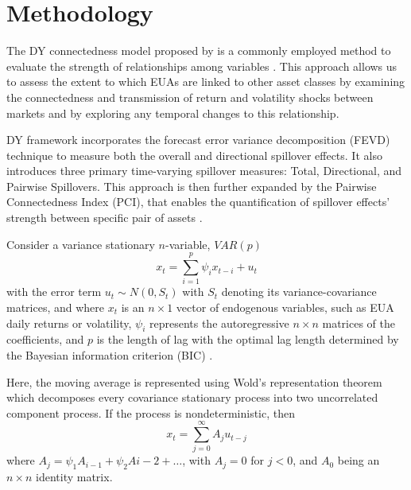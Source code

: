 \documentclass[preprint, 3p,
authoryear]{elsarticle} %
\begin{document}
\hypertarget{methodology}{%
\section{Methodology}\label{methodology}}

The DY connectedness model proposed by
\citet{diebold_measuring_2009, diebold_better_2012, diebold_network_2014}
is a commonly employed method to evaluate the strength of relationships
among variables
\citep{zhang_dynamic_2016, xia_asymmetric_2019, ji_information_2019, tan_how_2020, gabauer_dynamic_2021, hanif_nonlinear_2021, diebold_past_2023, dong_risk_2024, gong_physical_2024}.
This approach allows us to assess the extent to which EUAs are linked to
other asset classes by examining the connectedness and transmission of
return and volatility shocks between markets and by exploring any
temporal changes to this relationship.

DY framework incorporates the forecast error variance decomposition
(FEVD) technique to measure both the overall and directional spillover
effects. It also introduces three primary time-varying spillover
measures: Total, Directional, and Pairwise Spillovers. This approach is
then further expanded by the Pairwise Connectedness Index (PCI), that
enables the quantification of spillover effects' strength between
specific pair of assets \citep{gabauer_dynamic_2021}.

Consider a variance stationary \(n\)-variable, \(VAR(p)\)
\begin{equation}
x_t = \sum_{i=1}^p\psi_ix_{t-i}+u_t
\end{equation} with the error term \(u_t \sim N(0,S_t)\) with \(S_t\)
denoting its variance-covariance matrices, and where \(x_t\) is an
\(n \times 1\) vector of endogenous variables, such as EUA daily returns
or volatility, \(\psi_i\) represents the autoregressive \(n \times n\)
matrices of the coefficients, and \(p\) is the length of lag with the
optimal lag length determined by the Bayesian information criterion
(BIC) \citep{diebold_better_2012, pham_impact_2023}.

Here, the moving average is represented using Wold's representation
theorem \citep{wold_study_1939} which decomposes every covariance
stationary process into two uncorrelated component process. If the
process is nondeterministic, then \begin{equation}
x_t = \sum_{j=0}^\infty A_ju_{t-j}
\end{equation} where \(A_j = \psi_1A_{i-1}+\psi_2A{i-2}+\dots\), with
\(A_j=0\) for \(j<0\), and \(A_0\) being an \(n \times n\) identity
matrix.
\end{document}
